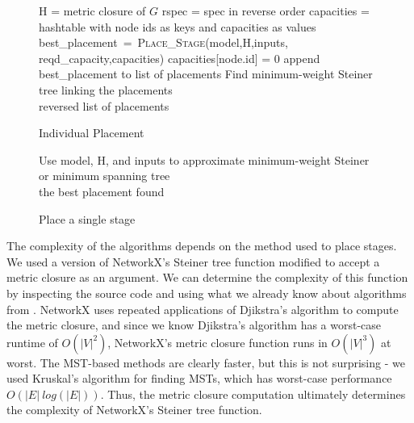 \documentclass[conference]{IEEEtran}
\begin{document}
   \begin{figure}
   	\centering
	\begin{algorithmic}[1]
	        \State H = metric closure of $G$
	        \State rspec = spec in reverse order
	        \State capacities = hashtable with node ids as keys and capacities as values
	            \State best\_placement~=~\textsc{Place\_Stage}(model,H,inputs,\\
	            reqd\_capacity,capacities)
	            \State capacities[node.id] = 0
	            \State append best\_placement to list of placements
	        \EndFor
	        \State Find minimum-weight Steiner tree linking the placements
	        \\
	        \Return reversed list of placements
	    \EndProcedure
	\end{algorithmic}
	\caption{Individual Placement}\label{alg_ind}
	\end{figure}

	\begin{figure}
    \centering
	\begin{algorithmic}[1]
	                \State Use model, H, and inputs to approximate minimum-weight Steiner or minimum spanning tree
	            \EndIf
	        \EndFor \\
	        \Return the best placement found 
	    \EndProcedure
	\end{algorithmic}
	\caption{Place a single stage}\label{placestage}
	\end{figure}
	
	The complexity of the algorithms depends on the method used to place stages. We used a version of NetworkX's Steiner tree function modified to accept a metric closure as an argument. We can determine the complexity of this function by inspecting the source code and using what we already know about algorithms from \cite{Cormen09introductionto}. NetworkX uses repeated applications of Djikstra's algorithm to compute the metric closure, and since we know Djikstra's algorithm has a worst-case runtime of $O(|V|^{2})$, NetworkX's metric closure function runs in $O(|V|^{3})$ at worst. The MST-based methods are clearly faster, but this is not surprising - we used Kruskal's algorithm for finding MSTs, which has worst-case performance $O(|E|\ log(|E|))$. Thus, the metric closure computation ultimately determines the complexity of NetworkX's Steiner tree function.
	
\end{document}
